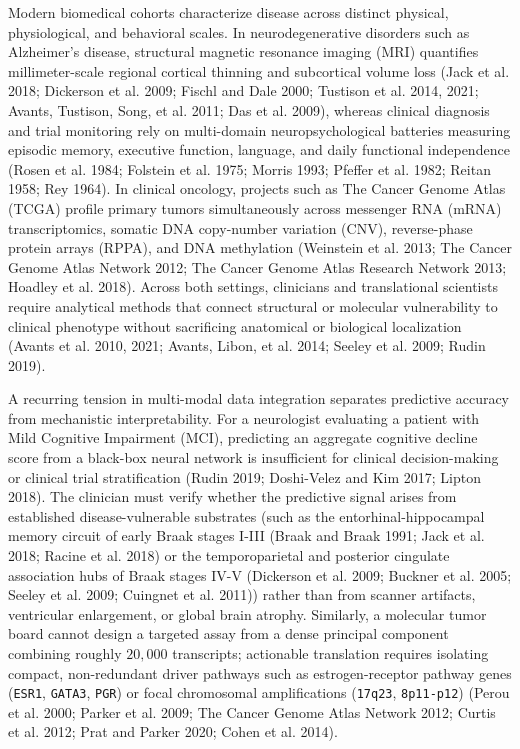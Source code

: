 \documentclass[
  10pt,
  letterpaper,
]{report}
\begin{document}
Modern biomedical cohorts characterize disease across distinct physical,
physiological, and behavioral scales. In neurodegenerative disorders
such as Alzheimer's disease, structural magnetic resonance imaging (MRI)
quantifies millimeter-scale regional cortical thinning and subcortical
volume loss ({Jack et al.} 2018; {Dickerson et al.} 2009; Fischl and
Dale 2000; Tustison et al. 2014, 2021; Avants, Tustison, Song, et al.
2011; Das et al. 2009), whereas clinical diagnosis and trial monitoring
rely on multi-domain neuropsychological batteries measuring episodic
memory, executive function, language, and daily functional independence
(Rosen et al. 1984; Folstein et al. 1975; Morris 1993; Pfeffer et al.
1982; Reitan 1958; Rey 1964). In clinical oncology, projects such as The
Cancer Genome Atlas (TCGA) profile primary tumors simultaneously across
messenger RNA (mRNA) transcriptomics, somatic DNA copy-number variation
(CNV), reverse-phase protein arrays (RPPA), and DNA methylation
(Weinstein et al. 2013; The Cancer Genome Atlas Network 2012; The Cancer
Genome Atlas Research Network 2013; {Hoadley et al.} 2018). Across both
settings, clinicians and translational scientists require analytical
methods that connect structural or molecular vulnerability to clinical
phenotype without sacrificing anatomical or biological localization
(Avants et al. 2010, 2021; Avants, Libon, et al. 2014; Seeley et al.
2009; Rudin 2019).

A recurring tension in multi-modal data integration separates predictive
accuracy from mechanistic interpretability. For a neurologist evaluating
a patient with Mild Cognitive Impairment (MCI), predicting an aggregate
cognitive decline score from a black-box neural network is insufficient
for clinical decision-making or clinical trial stratification (Rudin
2019; Doshi-Velez and Kim 2017; Lipton 2018). The clinician must verify
whether the predictive signal arises from established disease-vulnerable
substrates (such as the entorhinal-hippocampal memory circuit of early
Braak stages I-III (Braak and Braak 1991; {Jack et al.} 2018; Racine et
al. 2018) or the temporoparietal and posterior cingulate association
hubs of Braak stages IV-V ({Dickerson et al.} 2009; Buckner et al. 2005;
Seeley et al. 2009; Cuingnet et al. 2011)) rather than from scanner
artifacts, ventricular enlargement, or global brain atrophy. Similarly,
a molecular tumor board cannot design a targeted assay from a dense
principal component combining roughly \(20,000\) transcripts; actionable
translation requires isolating compact, non-redundant driver pathways
such as estrogen-receptor pathway genes (\texttt{ESR1}, \texttt{GATA3},
\texttt{PGR}) or focal chromosomal amplifications (\texttt{17q23},
\texttt{8p11-p12}) ({Perou et al.} 2000; {Parker et al.} 2009; The
Cancer Genome Atlas Network 2012; {Curtis et al.} 2012; Prat and Parker
2020; Cohen et al. 2014).
\end{document}

